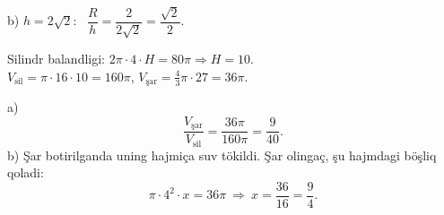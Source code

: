 b) $h=2\sqrt2$: \ $\dfrac Rh=\dfrac2{2\sqrt2}=\dfrac{\sqrt2}2$.

\newpage
{}
Silindr balandligi: $2\pi\cdot4\cdot H=80\pi\Rightarrow H=10$.\\
$V_{\text{sil}}=\pi\cdot16\cdot10=160\pi$, \quad $V_{\text{şar}}=\frac43\pi\cdot27=36\pi$.

a) \[\frac{V_{\text{şar}}}{V_{\text{sil}}}=\frac{36\pi}{160\pi}=\frac9{40}.\]
b) Şar botirilganda uning hajmiça suv tökildi. Şar olingaç, şu hajmdagi böşliq qoladi:
\[\pi\cdot4^2\cdot x=36\pi\ \Rightarrow\ x=\frac{36}{16}=\frac94.\]

\ShowJavoblar


